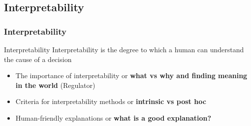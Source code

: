 \documentclass{beamer}\usepackage[]{graphicx}\usepackage[]{color}
\begin{document}
%
\subsection{Interpretability} %

\begin{frame}[fragile]
\frametitle{Interpretability}
\begin{block}{Interpretability}
Interpretability is the degree to which a human can understand the cause of a decision\footnotemark
\end{block}
\begin{itemize}
\item The importance of interpretability or \textbf{what vs why and finding meaning in the world} (Regulator)
\item Criteria for interpretability methods or \textbf{intrinsic vs post hoc}
\item Human-friendly explanations or \textbf{what is a good explanation?}
\end{itemize}
\end{frame}
\end{document}
